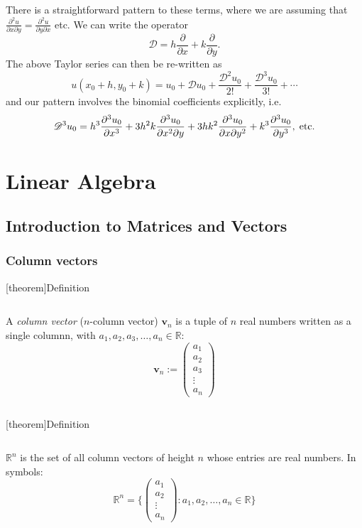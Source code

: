 \documentclass[12pt]{report}
\theoremstyle{definition}
\begin{document}
\medskip
\noindent There is a straightforward pattern to these terms, where we are assuming
that $\frac{\partial^{2}u}{\partial x \partial y} = \frac{\partial^{2}u}{\partial y \partial x} $ etc.
We can write the operator \[
\mathscr{D} = h\frac{\partial}{\partial x} + k\frac{\partial}{\partial y}.
\] 
The above Taylor series can then be re-written as\[
    u(x_0 + h, y_0 + k) = u_0 + \mathscr{D}u_0 + \frac{\mathscr{D}^{2}u_0}{2!} + \frac{\mathscr{D}^{3}u_0}{3!} + \cdots
\]and our pattern involves the binomial coefficients explicitly, i.e.\ \[
    \mathscr{D}^{3}u_0 = h^{3}\frac{\partial^{3}u_0}{\partial x^{3}}
    + 3h^{2}k\frac{\partial^{3}u_0}{\partial x^{2} \partial y}
    + 3hk^{2}\frac{\partial^{3}u_0}{\partial x \partial y^{2}} 
    + k^{3}\frac{\partial^{3}u_0}{\partial y^{3}},\;\textnormal{etc.}
\]



\chapter{Linear Algebra}

\section{Introduction to Matrices and Vectors}

\subsection{Column vectors}

[theorem]{Definition}
\begin{column vector}
    A \emph{column vector} ($n$-column vector) $\pmb{v}_n$ is a tuple of $n$ real numbers written as a single columnn, 
    with $a_1, a_2, a_3, \ldots, a_n \in \mathbb{R}$:\[
    \pmb{v}_n := 
    \begin{pmatrix}
        a_1 \\
        a_2 \\
        a_3 \\
        \vdots \\
        a_n
    \end{pmatrix}
    \]
\end{column vector}

[theorem]{Definition}
\begin{set of column vectors}
    $\mathbb{R}^{n}$ is the set of all column vectors of height $n$ whose entries are real numbers.
    In symbols:\[
        \mathbb{R}^{n} = \{
            \begin{pmatrix}
                    a_1\\
                    a_2\\
                    \vdots\\
                    a_n
            \end{pmatrix}
            : a_1, a_2, \ldots, a_n \in \mathbb{R}
        \} 
    \]
\end{set of column vectors}
\end{document}
